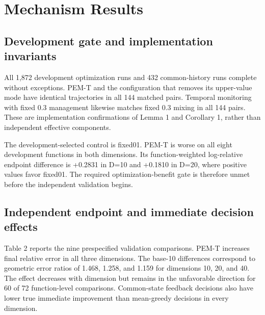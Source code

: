 \documentclass[cmc,article,submit,moreauthors,pdftex]{Definitions/tsp}
\begin{document}
\hypertarget{mechanism-results}{%
\section{Mechanism Results}\label{mechanism-results}}

\hypertarget{development-gate-and-implementation-invariants}{%
\subsection{Development gate and implementation invariants}\label{development-gate-and-implementation-invariants}}

All 1,872 development optimization runs and 432 common-history runs complete without exceptions. PEM-T and the configuration that removes its upper-value mode have identical trajectories in all 144 matched pairs. Temporal monitoring with fixed 0.3 management likewise matches fixed 0.3 mixing in all 144 pairs. These are implementation confirmations of Lemma 1 and Corollary 1, rather than independent effective components.

The development-selected control is fixed01. PEM-T is worse on all eight development functions in both dimensions. Its function-weighted log-relative endpoint difference is +0.2831 in D=10 and +0.1810 in D=20, where positive values favor fixed01. The required optimization-benefit gate is therefore unmet before the independent validation begins.

\hypertarget{independent-endpoint-and-immediate-decision-effects}{%
\subsection{Independent endpoint and immediate decision effects}\label{independent-endpoint-and-immediate-decision-effects}}

Table 2 reports the nine prespecified validation comparisons. PEM-T increases final relative error in all three dimensions. The base-10 differences correspond to geometric error ratios of 1.468, 1.258, and 1.159 for dimensions 10, 20, and 40. The effect decreases with dimension but remains in the unfavorable direction for 60 of 72 function-level comparisons. Common-state feedback decisions also have lower true immediate improvement than mean-greedy decisions in every dimension.
\end{document}
